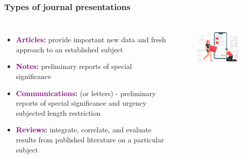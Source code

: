 \documentclass[newPxFont,sthlmFooter]{beamer}
\newcommand{\fs}{\footnotesize}
\begin{document}
  \begin{frame}\frametitle{Types of journal presentations}
    \begin{columns}[T,onlytextwidth]
    \begin{itemize}
      \fs
      \item \textcolor{purple}{\bf Articles:} provide important new data and fresh approach to an established subject
      \item \textcolor{purple}{\bf Notes:} preliminary reports of special significance
      \item \textcolor{purple}{\bf Communications:} (or letters) - preliminary reports of special significance and urgency subjected length restriction
      \item \textcolor{purple}{\bf Reviews:} integrate, correlate, and evaluate results from published literature on a particular subject
    \end{itemize}
          \vspace{0.5cm}
    \begin{figure}
      \centering
      \includegraphics[width=2in]{figs/art} 
    \end{figure}
    \end{columns}
  \end{frame}
  
\end{document}
